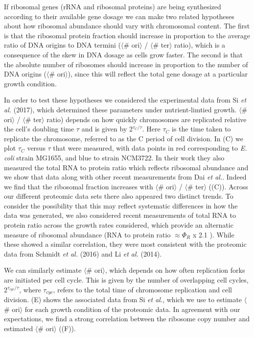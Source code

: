 If ribosomal genes (rRNA and ribosomal proteins) are being synthesized according
to their available gene dosage we can make two related hypotheses about how
ribosomal abundance should vary with chromosomal content. The first is that the
ribosomal protein fraction should increase in proportion  to the average ratio of
DNA origins to DNA termini ($\langle$\# ori$\rangle$ / $\langle$\# ter$\rangle$
ratio), which is a consequence of the skew in DNA dosage as cells grow faster.
The second is that the absolute number of ribosomes should increase in proportion to the number of DNA origins ($\langle$\# ori$\rangle$), since this will reflect the total gene dosage at a particular growth condition.

In order to test these hypotheses we considered the experimental data from Si
\textit{et al.} (2017), which determined these parameters under nutrient-limtied
growth. $\langle$\# ori$\rangle$ / $\langle$\# ter$\rangle$ ratio) depends on
how quickly chromosomes are replicated relative the cell's doubling time $\tau$
and is given by 2$^{\tau_C / \tau}$. Here $\tau_C$ is the time taken to
replicate the chromosome, referred to as the C period of cell division.  In
(C) we plot $\tau_C$ versus $\tau$ that were measured,
with data points in red corresponding to \textit{E. coli} strain MG1655, and
blue to strain NCM3722. In their work they also measured the total RNA to
protein ratio  which reflects ribosomal abundance and we show that data along
with other recent  measurements from Dai \textit{et al.}. Indeed we find that
the ribosomal fraction increases with $\langle$\# ori$\rangle$ / $\langle$\#
ter$\rangle$ ((C)). Across our different proteomic data
sets there also appeared two distinct trends. To consider the possibility that
this may reflect systematic differences in how the data was generated, we also
considered recent measurements of total RNA to protein ratio across the growth
rates considered, which provide an alternatic measure of ribosomal abundance
(RNA to protein ratio $\approx \Phi_R$ x 2.1 \cite{dai2016}). While these showed
a similar correlation, they were most consistent with the proteomic data from
Schmidt \textit{et al.} (2016) and Li \textit{et al.} (2014).

We can similarly estimate $\langle$\# ori$\rangle$, which depends on how often
replication forks are initiated per cell cycle. This is given by the number of
overlapping cell cycles,  2$^{\tau_{cyc} / \tau}$, where $\tau_{cyc}$, refers to
the total time of chromosome replication and cell division.
(E) shows the associated data from Si \textit{et al.},
which we use to estimate $\langle$\# ori$\rangle$  for each growth condition of
the proteomic data. In agreement with our expectations, we find a strong
correlation between the ribosome copy number and estimated $\langle$\#
ori$\rangle$ ((F)).


